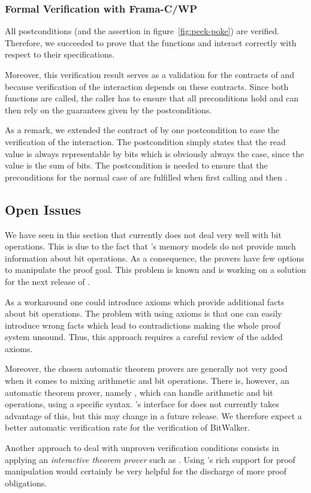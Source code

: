  \FloatBarrier

\subsubsection{Formal Verification with Frama-C/WP}

All postconditions (and the assertion in figure~\ref{fig:peek-poke})
are verified. Therefore, we succeeded to prove that the 
functions \peek and \poke interact correctly
with respect to their specifications.

Moreover, this verification result serves as a validation for the contracts
of \peek and \poke because verification of the interaction 
depends on these contracts. Since both functions are called,
the caller has to ensure that all preconditions hold
and can then rely on the guarantees given by the postconditions.

As a remark, we extended the contract of \peek by one postcondition 
to ease the verification of the interaction.
The postcondition simply states that the read value is always representable 
by  bits which is obviously always the case,
since the value is the sum of  bits.
The postcondition is needed to ensure that the preconditions for the normal case
of \poke are fulfilled when first calling \peek and then \poke.

\clearpage

\subsection{Open Issues}
\label{issues}


We have seen in this section that \wpframac currently does not deal very well with bit operations.
This is due to the fact that \wpframac's memory models do not provide 
much information about bit operations.
As a consequence, the provers have few options to manipulate the proof goal.
This problem is known and \cealist is working on a solution for the next release of \wpframac.

As a workaround one could introduce axioms which provide
additional facts about bit operations. 
The problem with using axioms is that one can easily introduce wrong facts
which lead to contradictions making the whole proof system unsound. 
Thus, this approach requires a careful review of the added axioms.

Moreover, the chosen automatic theorem provers are generally not very
good when it comes to mixing arithmetic and bit operations.
There is, however, an automatic theorem prover, namely \z,
which can handle arithmetic and bit operations, using a specific syntax.
\framac's interface for \z does not currently takes advantage of this, 
but this may change in a future release.
We therefore expect a better automatic verification rate for the verification of BitWalker.

Another approach to deal with unproven verification conditions consists in
applying an \emph{interactive theorem prover} such as \coq.
Using \coq's rich support for proof manipulation would certainly be very helpful
for the discharge of more proof obligations.

